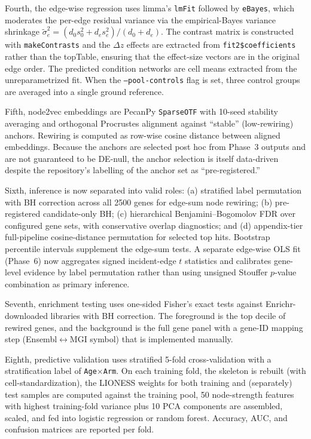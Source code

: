 \documentclass[11pt]{article}
\newcommand{\code}[1]{\texttt{#1}}
\newcommand{\pkg}[1]{\textsf{#1}}
\begin{document}
Fourth, the edge-wise regression uses limma's \code{lmFit} followed by \code{eBayes}, which moderates the per-edge residual variance via the empirical-Bayes variance shrinkage $\tilde{\sigma}^2_e = (d_0 s_0^2 + d_e s_e^2)/(d_0 + d_e)$. The contrast matrix is constructed with \code{makeContrasts} and the $\Delta z$ effects are extracted from \code{fit2\$coefficients} rather than the topTable, ensuring that the effect-size vectors are in the original edge order. The predicted condition networks are cell means extracted from the unreparametrized fit. When the \code{--pool-controls} flag is set, three control groups are averaged into a single ground reference.

Fifth, node2vec embeddings are \pkg{PecanPy} \code{SparseOTF} with 10-seed stability averaging and orthogonal Procrustes alignment against ``stable'' (low-rewiring) anchors. Rewiring is computed as row-wise cosine distance between aligned embeddings. Because the anchors are selected post hoc from Phase~3 outputs and are not guaranteed to be DE-null, the anchor selection is itself data-driven despite the repository's labelling of the anchor set as ``pre-registered.''

Sixth, inference is now separated into valid roles: (a) stratified label permutation with BH correction across all 2500 genes for edge-sum node rewiring; (b) pre-registered candidate-only BH; (c) hierarchical Benjamini--Bogomolov FDR over configured gene sets, with conservative overlap diagnostics; and (d) appendix-tier full-pipeline cosine-distance permutation for selected top hits. Bootstrap percentile intervals supplement the edge-sum tests. A separate edge-wise OLS fit (Phase~6) now aggregates signed incident-edge $t$ statistics and calibrates gene-level evidence by label permutation rather than using unsigned Stouffer $p$-value combination as primary inference.

Seventh, enrichment testing uses one-sided Fisher's exact tests against Enrichr-downloaded libraries with BH correction. The foreground is the top decile of rewired genes, and the background is the full gene panel with a gene-ID mapping step (Ensembl$\leftrightarrow$MGI symbol) that is implemented manually.

Eighth, predictive validation uses stratified 5-fold cross-validation with a stratification label of \code{Age$\times$Arm}. On each training fold, the skeleton is rebuilt (with cell-standardization), the LIONESS weights for both training and (separately) test samples are computed against the training pool, 50 node-strength features with highest training-fold variance plus 10 PCA components are assembled, scaled, and fed into logistic regression or random forest. Accuracy, AUC, and confusion matrices are reported per fold.
\end{document}
